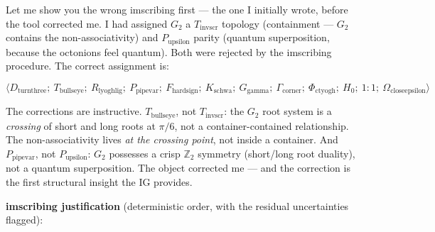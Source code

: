 \documentclass[12pt,a4paper]{article}
\begin{document}
Let me show you the wrong imscribing first --- the one I initially wrote, before the tool corrected me. I had assigned $G_2$ a $T_{\text{invscr}}$ topology (containment --- $G_2$ contains the non-associativity) and $P_{\text{upsilon}}$ parity (quantum superposition, because the octonions feel quantum). Both were rejected by the imscribing procedure. The correct assignment is:

\[\langle D_{\text{turnthree}};\ T_{\text{bullseye}};\ R_{\text{lyoghlig}};\ P_{\text{pipevar}};\ F_{\text{hardsign}};\ K_{\text{schwa}};\ G_{\text{gamma}};\ \Gamma_{\text{corner}};\ \Phi_{\text{ctyogh}};\ H_0;\ 1{:}1;\ \Omega_{\text{closeepsilon}} \rangle\]

The corrections are instructive. $T_{\text{bullseye}}$, not $T_{\text{invscr}}$: the $G_2$ root system is a \emph{crossing} of short and long roots at $\pi/6$, not a container-contained relationship. The non-associativity lives \emph{at the crossing point}, not inside a container. And $P_{\text{pipevar}}$, not $P_{\text{upsilon}}$: $G_2$ possesses a crisp $\mathbb{Z}_2$ symmetry (short/long root duality), not a quantum superposition. The object corrected me --- and the correction is the first structural insight the IG provides.

\textbf{imscribing justification} (deterministic order, with the residual uncertainties flagged):
\end{document}
